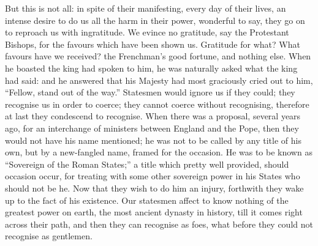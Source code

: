 But this is not all: in spite of their manifesting,
every day of their lives, an intense desire to do us all
the harm in their power, wonderful to say, they go on to
reproach us with ingratitude. We evince no gratitude, say
the Protestant Bishops, for the favours which have been
shown us. Gratitude for what? What favours have we
received? the Frenchman's good fortune, and nothing else.
When he boasted the king had spoken to him, he was
naturally asked what the king had said: and he answered
that his Majesty had most graciously cried out to him,
``Fellow, stand out of the way.'' Statesmen would
ignore us if they could; they recognise us in order to
coerce; they cannot coerce without recognising, therefore
at last they condescend to recognise. When there was a
proposal, several years ago, for an interchange of
ministers between England and the Pope, then they would
not have his name mentioned; he was not to be called by
any title of his own, but by a new-fangled name, framed
for the occasion. He was to be known as ``Sovereign
of the Roman States;'' a title which pretty well
provided, should occasion occur, for treating with some
other sovereign power in his States who should not be he.
Now that they wish to do him an injury, forthwith they
wake up to the fact of his existence. Our statesmen
affect to know nothing of the greatest power on earth,
the most ancient dynasty in history, till it comes right
across their path, and then they can recognise as foes,
what before they could not recognise as gentlemen.

